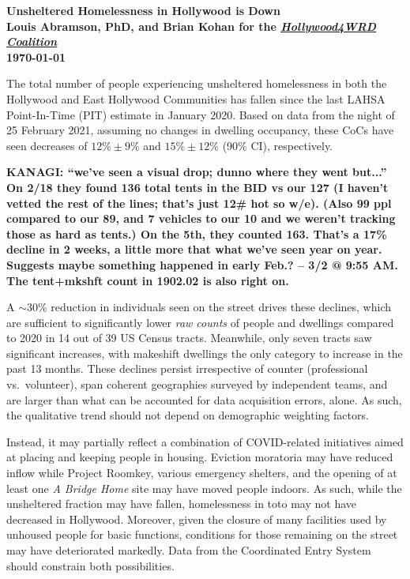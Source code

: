 \documentclass[11pt]{article}
\def\bfr{\bf\color{red}}
\def\resp{respectively}
\begin{document}

\begin{center}
	\Large\bf Unsheltered Homelessness in Hollywood is Down\\
	\vspace{1ex}
	{\normalsize\rm Louis Abramson, PhD, and Brian Kohan 
	for the \href{http://www.hollywood4wrd.live}{\it Hollywood4WRD Coalition} \\ \today}


\end{center}

 The total number of people experiencing unsheltered homelessness in both the 
Hollywood and East Hollywood Communities has fallen since the last LAHSA Point-In-Time (PIT) 
estimate in January 2020. Based on data from the night of 25 February 2021, assuming no changes in
dwelling occupancy, these CoCs have seen decreases of $12\%\pm9\%$ and $15\%\pm12\%$ (90\% CI), \resp. 

{\bfr KANAGI: ``we've seen a visual drop; dunno where they went but...'' On 2/18 they found 136 
total tents in the BID vs our 127 (I haven't vetted the rest of the lines; that's just 12\# hot so w/e). (Also 99
ppl compared to our 89, and 7 vehicles to our 10 and we weren't tracking those as hard as tents.) 
On the 5th, they counted 163. That's a 17\% decline in 2 weeks, a little more that what we've seen year on year.
Suggests maybe something happened in early Feb.? -- 3/2 @ 9:55 AM. The tent+mkshft count in 1902.02 is also 
right on.}

A $\sim$30\% reduction in individuals seen on the street drives these declines, which are sufficient to 
significantly lower {\it raw counts} of people and dwellings compared to 2020 in 14 out of 39 US Census tracts. 
Meanwhile, only seven tracts saw significant increases, with makeshift dwellings the only category to increase in the 
past 13 months. These declines persist irrespective of counter (professional vs.\ volunteer), span coherent geographies 
surveyed by independent teams, and are larger than what can be accounted for data acquisition errors, alone. 
As such, the qualitative trend should not depend on demographic weighting factors. 

Instead, it may partially reflect a combination of COVID-related initiatives aimed at placing and keeping people in 
housing. Eviction moratoria may have reduced inflow while Project Roomkey, various emergency shelters, and the 
opening of at least one {\it A Bridge Home} site may have moved people indoors. As such, while the unsheltered 
fraction may have fallen, homelessness in toto may not have decreased in Hollywood. Moreover, given the closure
of many facilities used by unhoused people for basic functions, conditions for those remaining on the street may
have deteriorated markedly. Data from the Coordinated Entry System should constrain both possibilities.
\end{document}
